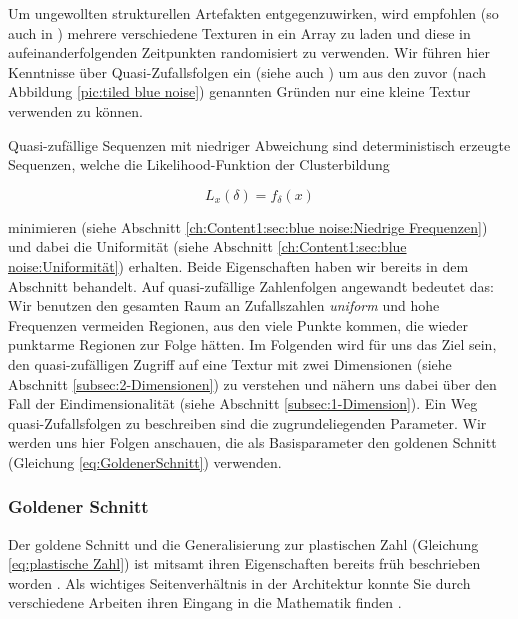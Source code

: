 Um ungewollten strukturellen Artefakten entgegenzuwirken, wird empfohlen (so auch in \cite{bluenoisechrisschied})
mehrere verschiedene  Texturen in ein Array zu laden und diese in aufeinanderfolgenden
Zeitpunkten randomisiert zu verwenden. Wir führen hier Kenntnisse über Quasi-Zufallsfolgen ein (siehe auch \cite{quasirandomsequencesbyRoberts}) 
um aus den zuvor (nach Abbildung \ref{pic:tiled blue noise}) genannten Gründen nur eine kleine  Textur verwenden zu können.\par
\newpage
Quasi-zufällige Sequenzen mit niedriger Abweichung sind deterministisch erzeugte Sequenzen, welche die Likelihood-Funktion der Clusterbildung

\begin{tcolorbox}[rightrule=3mm, rounded corners=east]
    \begin{equation}\label{eq:Likeli-Hood-Gleichung}
        L_{x}(\delta) = f_{\delta}(x)
    \end{equation}
\end{tcolorbox}

minimieren (siehe Abschnitt \ref{ch:Content1:sec:blue noise:Niedrige Frequenzen}) und dabei die 
Uniformität (siehe Abschnitt \ref{ch:Content1:sec:blue noise:Uniformität}) erhalten. Beide Eigenschaften 
haben wir bereits in dem  Abschnitt behandelt.
Auf quasi-zufällige Zahlenfolgen angewandt bedeutet das: Wir benutzen den gesamten Raum an Zufallszahlen
\textit{uniform} und hohe Frequenzen vermeiden Regionen, aus den viele Punkte kommen, die wieder 
punktarme Regionen zur Folge hätten.   
Im Folgenden wird für uns das Ziel sein, den quasi-zufälligen Zugriff auf eine Textur 
mit zwei Dimensionen (siehe Abschnitt \ref{subsec:2-Dimensionen}) zu verstehen und nähern 
uns dabei über den Fall der Eindimensionalität (siehe Abschnitt \ref{subsec:1-Dimension}).
Ein Weg quasi-Zufallsfolgen zu beschreiben sind die zugrundeliegenden Parameter. 
Wir werden uns hier Folgen anschauen, die als Basisparameter den 
goldenen Schnitt (Gleichung \ref{eq:GoldenerSchnitt}) verwenden.

\subsubsection{Goldener Schnitt}

Der goldene Schnitt und die Generalisierung zur plastischen Zahl (Gleichung \ref{eq:plastische Zahl})
ist mitsamt ihren Eigenschaften bereits früh beschrieben worden \cite{vanderlaanplasticnumber}.
Als wichtiges Seitenverhältnis in der Architektur konnte Sie durch verschiedene Arbeiten ihren 
Eingang in die Mathematik finden \cite{krcadinac2006new}.

